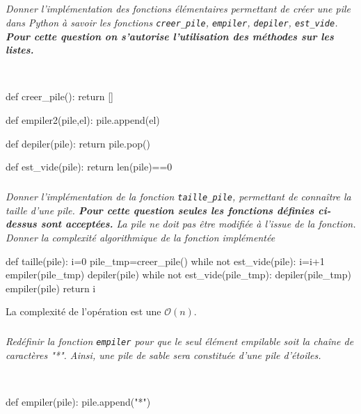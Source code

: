 \documentclass[10pt,fleqn]{article} %
\begin{document}
\subparagraph{}
\textit{Donner l'implémentation des fonctions élémentaires permettant de créer une pile dans Python à savoir les fonctions \texttt{creer\_pile}, \texttt{empiler}, \texttt{depiler}, \texttt{est\_vide}. \textbf{Pour cette question on s'autorise l'utilisation des méthodes sur les listes.}}
\ifprof
\begin{corrige}
~\\
\begin{minipage}[c]{.2\linewidth}
\begin{python}
def creer_pile():
    return []
\end{python}
\end{minipage}\hfill
\begin{minipage}[c]{.2\linewidth}
\begin{python}
def empiler2(pile,el):
    pile.append(el)
\end{python}
\end{minipage}\hfill
\begin{minipage}[c]{.2\linewidth}
\begin{python} 
def depiler(pile):
    return pile.pop()
\end{python}
\end{minipage}\hfill
\begin{minipage}[c]{.2\linewidth}
\begin{python}
def est_vide(pile):
    return len(pile)==0
\end{python}
\end{minipage}
\end{corrige}
\else
\fi

\subparagraph{}
\textit{Donner l'implémentation de la fonction \texttt{taille\_pile}, permettant de connaître la taille d'une pile. \textbf{Pour cette question seules les fonctions définies ci-dessus sont acceptées.} La pile ne doit pas être modifiée à l'issue de la fonction. Donner la complexité algorithmique de la fonction implémentée}
\ifprof
\begin{corrige}    
\begin{python}
def taille(pile):
    i=0
    pile_tmp=creer_pile()
    while not est_vide(pile):
        i=i+1
        empiler(pile_tmp)
        depiler(pile)
    while not est_vide(pile_tmp):
        depiler(pile_tmp)
        empiler(pile)
    return i
\end{python}
La complexité de l'opération est une $\mathcal{O}(n)$.
\end{corrige}
\else
\fi

\subparagraph{}
\textit{Redéfinir la fonction \texttt{empiler} pour que le seul élément empilable soit la chaîne de caractères "*". Ainsi, une pile de sable sera constituée d'une pile d'étoiles. }
\ifprof
\begin{corrige}
~\\
\begin{python}
def empiler(pile):
    pile.append("*")
\end{python}

\end{corrige}
\else
\fi
\end{document}
